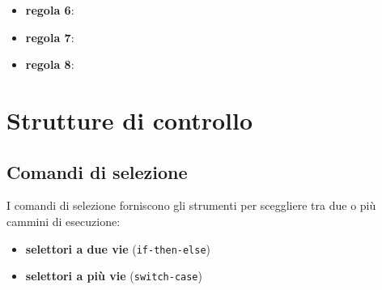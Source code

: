 \begin{itemize}[label=$\triangleright$, itemsep=\smallskipamount]
    \item \textbf{regola 6}:
    \item \textbf{regola 7}:
    \item \textbf{regola 8}:
\end{itemize}

\section{Strutture di controllo}

\subsection{Comandi di selezione}
I comandi di selezione forniscono gli strumenti per sceggliere tra due o più cammini di esecuzione:
\begin{itemize}[label=$\triangleright$, itemsep=\smallskipamount]
    \item \textbf{selettori a due vie} (\texttt{if-then-else})
    \item \textbf{selettori a più vie} (\texttt{switch-case})
\end{itemize}

